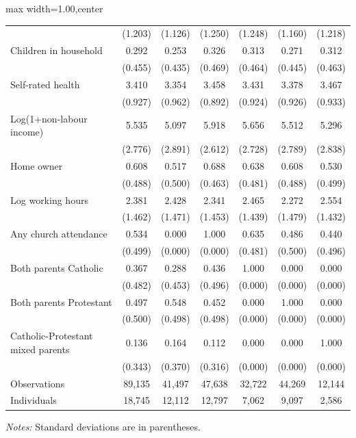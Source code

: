 \begin{table}[!htbp]
\begin{adjustbox}{max width=1.00\textwidth,center}
\begin{tabular}{lcccccc}
  & (1.203) & (1.126) & (1.250) & (1.248) & (1.160) & (1.218) \\
Children in household & 0.292 & 0.253 & 0.326 & 0.313 & 0.271 & 0.312 \\
  & (0.455) & (0.435) & (0.469) & (0.464) & (0.445) & (0.463) \\
Self-rated health & 3.410 & 3.354 & 3.458 & 3.431 & 3.378 & 3.467 \\
  & (0.927) & (0.962) & (0.892) & (0.924) & (0.926) & (0.933) \\
Log(1+non-labour income) & 5.535 & 5.097 & 5.918 & 5.656 & 5.512 & 5.296 \\
  & (2.776) & (2.891) & (2.612) & (2.728) & (2.789) & (2.838) \\
Home owner & 0.608 & 0.517 & 0.688 & 0.638 & 0.608 & 0.530 \\
  & (0.488) & (0.500) & (0.463) & (0.481) & (0.488) & (0.499) \\
Log working hours & 2.381 & 2.428 & 2.341 & 2.465 & 2.272 & 2.554 \\
  & (1.462) & (1.471) & (1.453) & (1.439) & (1.479) & (1.432) \\
Any church attendance & 0.534 & 0.000 & 1.000 & 0.635 & 0.486 & 0.440 \\
  & (0.499) & (0.000) & (0.000) & (0.481) & (0.500) & (0.496) \\
Both parents Catholic & 0.367 & 0.288 & 0.436 & 1.000 & 0.000 & 0.000 \\
  & (0.482) & (0.453) & (0.496) & (0.000) & (0.000) & (0.000) \\
Both parents Protestant & 0.497 & 0.548 & 0.452 & 0.000 & 1.000 & 0.000 \\
  & (0.500) & (0.498) & (0.498) & (0.000) & (0.000) & (0.000) \\
Catholic-Protestant mixed parents & 0.136 & 0.164 & 0.112 & 0.000 & 0.000 & 1.000 \\
  & (0.343) & (0.370) & (0.316) & (0.000) & (0.000) & (0.000) \\
\midrule
Observations & 89,135 & 41,497 & 47,638 & 32,722 & 44,269 & 12,144 \\
Individuals & 18,745 & 12,112 & 12,797 & 7,062 & 9,097 & 2,586 \\
\bottomrule
\end{tabular}
\end{adjustbox}
\vspace{0.45em}
\begin{minipage}{1.00\textwidth}
\footnotesize
\emph{Notes:} Standard deviations are in parentheses. 

\end{minipage}
\end{table}
